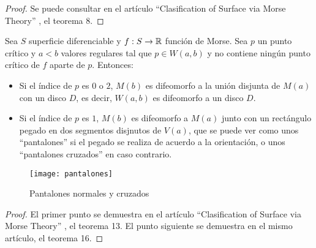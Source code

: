 \begin{proof}
	Se puede consultar en el artículo ``Clasification of Surface via Morse Theory'' \cite{MorseTh1}, el teorema 8.
\end{proof}

\begin{teorema}
	Sea $S$ superficie diferenciable y $f: S \rightarrow \mathbb{R}$ función de Morse. Sea $p$ un punto crítico y $a < b$ valores regulares tal que $p \in W(a,b)$ y no contiene ningún punto crítico de $f$ aparte de $p$. Entonces:
	\begin{itemize}
		\item Si el índice de $p$ es $0$ o $2$, $M(b)$ es difeomorfo a la unión disjunta de $M(a)$ con un disco $D$, es decir, $W(a,b)$ es difeomorfo a un disco $D$.
		\item Si el índice de $p$ es $1$, $M(b)$ es difeomorfo a $M(a)$ junto con un rectángulo pegado  en dos segmentos disjnutos de $V(a)$, que se puede ver como unos ``pantalones'' si el pegado se realiza de acuerdo a la orientación, o unos ``pantalones cruzados'' en caso contrario.
	\end{itemize}
\end{teorema}

\begin{figure}[h]
  	\centering
  	\texttt{[image: pantalones]}
  	\caption{Pantalones normales y cruzados}
  	\label{fig:pantalones}
\end{figure}

\begin{proof}
	El primer punto se demuestra en el artículo ``Clasification of Surface via Morse Theory'' \cite{MorseTh1}, el teorema 13. El punto siguiente se demuestra en el mismo artículo, el teorema 16.
\end{proof}

\endinput

